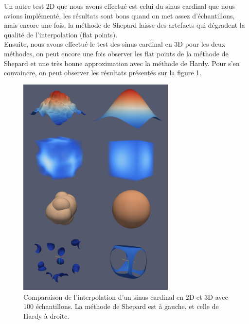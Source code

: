 \documentclass[a4paper,9pt]{article}
\begin{document}
Un autre test 2D que nous avons effectué est celui du sinus cardinal que nous avions implémenté, les résultats sont bons quand on met assez d'échantillons, mais encore une fois, la méthode de Shepard laisse des artefacts qui dégradent la qualité de l'interpolation (flat points).\\
Ensuite, nous avons effectué le test des sinus cardinal en 3D pour les deux méthodes, on peut encore une fois observer les flat points de la méthode de Shepard et une très bonne approximation avec la méthode de Hardy. Pour s'en convaincre, on peut observer les résultats présentés sur la figure \ref{comparaison_sinc}.

\begin{figure}[!h]
\centering
\includegraphics[width=0.7\textwidth]{images/comparaison_sinc.png}
\caption{Comparaison de l'interpolation d'un sinus cardinal en 2D et 3D avec 100 échantillons. La méthode de Shepard est à gauche, et celle de Hardy à droite.}
\label{comparaison_sinc}
\end{figure}

\clearpage
\newpage
\end{document}
